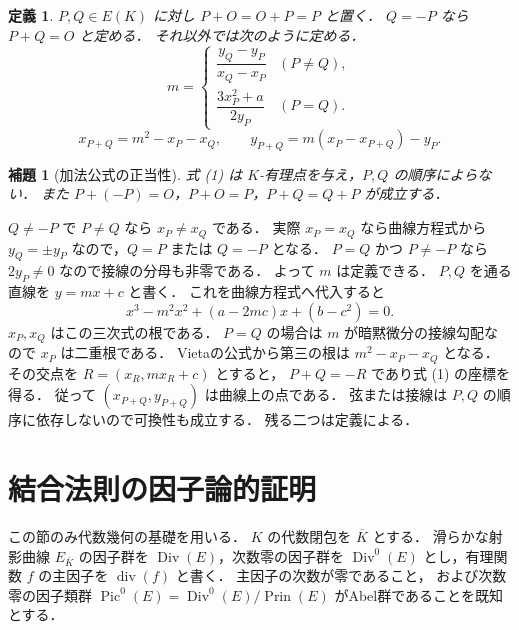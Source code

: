 \documentclass[a5paper,10pt,onecolumn]{jsarticle}
\makeatletter
\theoremstyle{mathnotetheorem}
\newtheorem{definition}[theorem]{定義}
\newtheorem{lemma}[theorem]{補題}
\renewcommand{\proofname}{証明}
\renewenvironment{proof}[1][\proofname]{%
  \par\pushQED{\qed}\normalfont\topsep4\p@\@plus2\p@\relax
  \trivlist\item[\hskip\labelsep\bfseries #1]\ignorespaces
}{\popQED\endtrivlist\@endpefalse}
\makeatother
\begin{document}
\begin{definition}
$P,Q\in E(K)$ に対し $P+O=O+P=P$ と置く．
$Q=-P$ なら $P+Q=O$ と定める．
それ以外では次のように定める．
\[
 m=\begin{cases}
 \dfrac{y_Q-y_P}{x_Q-x_P}&(P\ne Q),\\[2mm]
 \dfrac{3x_P^2+a}{2y_P}&(P=Q).
 \end{cases}
\]
\[
 x_{P+Q}=m^2-x_P-x_Q,\qquad
 y_{P+Q}=m(x_P-x_{P+Q})-y_P.
 \tag{1}
\]
\end{definition}

\begin{lemma}[加法公式の正当性]\label{lem:add-well}
式 (1) は $K$-有理点を与え，$P,Q$ の順序によらない．
また $P+(-P)=O$，$P+O=P$，$P+Q=Q+P$ が成立する．
\end{lemma}
\begin{proof}
$Q\ne-P$ で $P\ne Q$ なら $x_P\ne x_Q$ である．
実際 $x_P=x_Q$ なら曲線方程式から
$y_Q=\pm y_P$ なので，$Q=P$ または $Q=-P$ となる．
$P=Q$ かつ $P\ne-P$ なら $2y_P\ne0$ なので接線の分母も非零である．
よって $m$ は定義できる．
$P,Q$ を通る直線を $y=mx+c$ と書く．
これを曲線方程式へ代入すると
\[
 x^3-m^2x^2+(a-2mc)x+(b-c^2)=0.
\]
$x_P,x_Q$ はこの三次式の根である．
$P=Q$ の場合は $m$ が暗黙微分の接線勾配なので
$x_P$ は二重根である．
Vietaの公式から第三の根は $m^2-x_P-x_Q$ となる．
その交点を $R=(x_R,mx_R+c)$ とすると，
$P+Q=-R$ であり式 (1) の座標を得る．
従って $(x_{P+Q},y_{P+Q})$ は曲線上の点である．
弦または接線は $P,Q$ の順序に依存しないので可換性も成立する．
残る二つは定義による．
\end{proof}

\section{結合法則の因子論的証明}

この節のみ代数幾何の基礎を用いる．
$K$ の代数閉包を $\overline K$ とする．
滑らかな射影曲線 $E_{\overline K}$ の因子群を
$\operatorname{Div}(E)$，次数零の因子群を
$\operatorname{Div}^0(E)$ とし，有理関数 $f$ の主因子を
$\operatorname{div}(f)$ と書く．
主因子の次数が零であること，
および次数零の因子類群
$\operatorname{Pic}^0(E)
 =\operatorname{Div}^0(E)/\operatorname{Prin}(E)$
がAbel群であることを既知とする．
\end{document}
